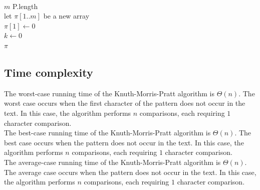 \documentclass[11pt]{article}
\begin{document}
            \begin{algorithm}[H] \label{alg:compute_prefix_function}
            \SetAlgoLined
            \vspace{0.5em}
             \\
            \vspace{0.5em}

                $m$ \leftarrow P.length\; \\
                let $\pi[1..m]$ be a new array\; \\
                $\pi[1] \leftarrow 0$\; \\
                $k \leftarrow 0$\; \\
                \Return $\pi$\;

            \end{algorithm}

        \subsection{Time complexity} \label{subsec:kmp_time_complexity}

            The worst-case running time of the Knuth-Morris-Pratt algorithm is $\Theta(n)$.
            The worst case occurs when the first character of the pattern does not occur in the text.
            In this case, the algorithm performs $n$ comparisons, each requiring $1$ character comparison. \\

            The best-case running time of the Knuth-Morris-Pratt algorithm is $\Theta(n)$.
            The best case occurs when the pattern does not occur in the text.
            In this case, the algorithm performs $n$ comparisons, each requiring $1$ character comparison. \\

            The average-case running time of the Knuth-Morris-Pratt algorithm is $\Theta(n)$.
            The average case occurs when the pattern does not occur in the text.
            In this case, the algorithm performs $n$ comparisons, each requiring $1$ character comparison.
\end{document}
